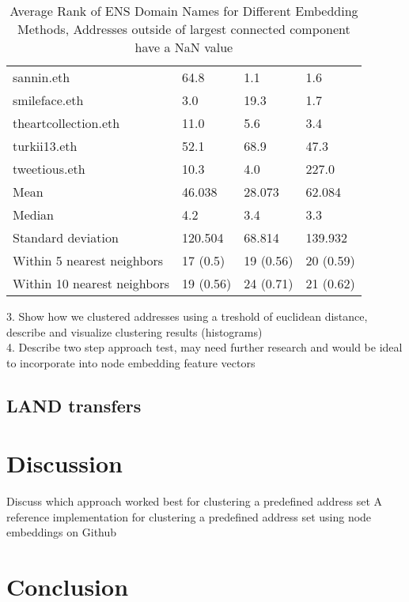 \documentclass[12pt,a4paper,titlepage,oneside,english]{article}
\begin{document}
\begin{table}[h!]
\begin{tabular}{llll}
	sannin.eth & 64.8 & 1.1 & 1.6 \\
	smileface.eth & 3.0 & 19.3 & 1.7 \\
	theartcollection.eth & 11.0 & 5.6 & 3.4 \\
	turkii13.eth & 52.1 & 68.9 & 47.3 \\
	tweetious.eth & 10.3 & 4.0 & 227.0 \\
    \hline
    Mean & 46.038 & 28.073 & 62.084 \\
    Median & 4.2 & 3.4 & 3.3 \\
    Standard deviation & 120.504 & 68.814 &  139.932\\
    Within 5 nearest neighbors & 17 (0.5) & 19 (0.56) & 20 (0.59) \\
    Within 10 nearest neighbors & 19 (0.56) & 24 (0.71) & 21 (0.62)\\
    \hline
  \end{tabular}
  \caption{Average Rank of ENS Domain Names for Different Embedding Methods, Addresses outside of largest connected component have a NaN value}
  \label{tbl:ENS_Domain_Ranks}
\end{table}

3. Show how we clustered addresses using a treshold of euclidean distance, describe and visualize clustering results (histograms) \\
4. Describe two step approach test, may need further research and would be ideal to incorporate into node embedding feature vectors \\


\subsection{LAND transfers}




\section{Discussion}
Discuss which approach worked best for clustering a predefined address set
A reference implementation for clustering a predefined address set using node embeddings on Github



\section{Conclusion}
\end{document}
